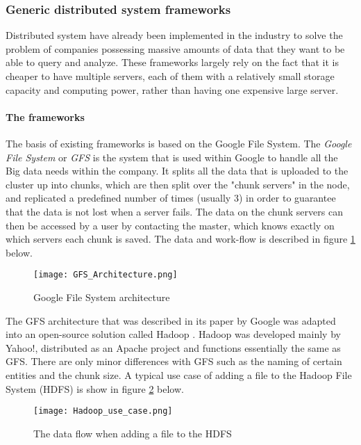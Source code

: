 \subsubsection{Generic distributed system frameworks}
Distributed system have already been implemented in the industry to solve the problem of companies possessing massive amounts of data that they want to be able to query and analyze. These frameworks largely rely on the fact that it is cheaper
to have multiple servers, each of them with a relatively small storage capacity and computing power, rather than having one expensive large server.

\paragraph{The frameworks}
The basis of existing frameworks is based on the Google File System\cite{Ghem03}. The \textit{Google File System} or \textit{GFS} is the system that is used within Google to handle all the Big data needs within the company. It splits all the data that is uploaded to the cluster up into chunks, which are then split over the "chunk servers" in the node, and replicated a predefined number of times (usually 3) in order to guarantee that the data is not lost when a server fails. The
data on the chunk servers can then be accessed by a user by contacting the master, which knows exactly on which servers each chunk is saved.\cite{Ghem03} The data and work-flow is described in figure \ref{GFS_Architecture} below.

\begin{figure}
  \texttt{[image: GFS\_Architecture.png]}
  \caption{Google File System architecture\cite{Ghem03}}
  \label{GFS_Architecture}
\end{figure}

The GFS architecture that was described in its paper by Google was adapted into an open-source solution called Hadoop \cite{Shv10}. Hadoop was developed mainly by Yahoo!, distributed as an Apache project and functions essentially the same as GFS. There are only minor differences with GFS such as the naming of certain entities and the chunk size. A typical use case of adding a file to the Hadoop File System (HDFS) is show in figure \ref{Hadoop_usecase} below.

\begin{figure}
  \texttt{[image: Hadoop\_use\_case.png]}
  \caption{The data flow when adding a file to the HDFS\cite{Shv10}}
  \label{Hadoop_usecase}
\end{figure}

